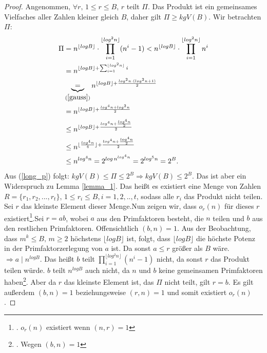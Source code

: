 \documentclass[12pt,oneside]{article}
\theoremstyle{remark}
\theoremstyle{definition}
\begin{document}
\begin{proof}
Angenommen, $\forall r, \, 1 \leq r \leq B$, $r$ teilt $\Pi$. Das Produkt ist ein gemeinsames Vielfaches aller Zahlen kleiner gleich $B$, daher gilt $\Pi \geq kgV(B)$.\newline
Wir betrachten $\Pi$:
\begin{equation}\label{long_p}
    \begin{split}
        \begin{aligned}
            \Pi &= n^{\lfloor log B \rfloor } \cdot \prod_{i = 1}^{\lfloor log^2 n \rfloor} (n^i - 1)
                < n^{\lfloor log B \rfloor } \cdot \prod_{i = 1}^{\lfloor log^2 n \rfloor} n^i \\
                &= n^{\lfloor log B \rfloor + \sum_{i = 1}^{\lfloor log^2 n \rfloor } i}\\ 
                &\underbrace{=}_{(\ref{gauss})} n^{\lfloor log B \rfloor + \frac{log^2 n \cdot (log^2 n + 1)}{2}}  \\
                &= n^{\lfloor log B \rfloor + \frac{log^4 n + log^2 n}{2}}\\
                & \leq n^{\lfloor log B \rfloor + \frac{log^4 n + \frac{log^4 n}{2}}{2}}\\
                & \leq n^{\lfloor \frac{log^4 n}{4} \rfloor + \frac{log^4 n + \frac{log^4 n}{2}}{2}}\\
                &\leq n^{log^4 n} = 2^{log \, n^{log^4 n}} = 2^{log^5 n} = 2^{B}.
        \end{aligned}
    \end{split}
\end{equation}
Aus (\ref{long_p}) folgt: $kgV(B) \leq \Pi \leq 2^B \Rightarrow kgV(B) \leq 2^B$. Das ist aber ein Widerspruch zu Lemma \ref{lemma_1}. Das heißt es existiert eine Menge von Zahlen $R = \{r_{1},r_{2},...,r_{t}\}$, $ 1 \leq r_i \leq B$,$\, i = 1,2, ..,t$, sodass alle $r_{i}$ das Produkt nicht teilen. Sei $r$ das kleinste Element dieser Menge.\newline\newline Nun zeigen wir, dass $o_{r}(n)$ für dieses $r$ existiert\footnote{. $o_{r}(n)$ existiert wenn $(n,r) = 1$}.\newline\newline Sei $r = ab $, wobei $a$ aus den Primfaktoren besteht, die $n$ teilen und $b$ aus den restlichen Primfaktoren. Offensichtlich $(b,n) = 1$. Aus der Beobachtung, dass $m^k \leq B, \, m \geq 2$ höchstens $\lfloor log B \rfloor$ ist, folgt, dass $ \lfloor log B \rfloor$  die höchste Potenz in der Primfaktorzerlegung von $a$ ist. Da sonst $a \leq r$ größer als $B$ wäre.\newline\newline
$\Rightarrow a \mid n^{log B}$.\newline\newline
Das heißt $b$ teilt $\prod_{i = 1}^{\lfloor log^2 n \rfloor}(n^i - 1)$ nicht, da sonst $r$ das Produkt teilen würde. $b$ teilt $n^{log B}$ auch nicht, da $n$ und $b$ keine gemeinsamen Primfaktoren haben\footnote{. Wegen $(b,n) = 1$}. Aber da $r$ das kleinste Element ist, das $\Pi$ nicht teilt, gilt $r= b$. Es gilt außerdem $(b,n) = 1$ beziehungsweise $(r,n) = 1$ und somit existiert $o_{r}(n)$.\newline


\end{proof}
\end{document}
